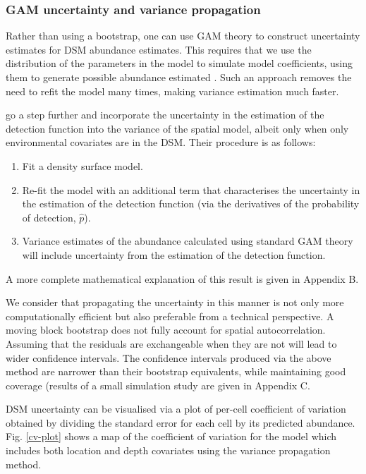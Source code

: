 \documentclass[a4paper,12pt]{article}
\begin{document}
\subsubsection*{GAM uncertainty and variance propagation}

Rather than using a bootstrap, one can use GAM theory to construct uncertainty estimates for DSM abundance estimates. This requires that we use the distribution of the parameters in the model to simulate model coefficients, using them to generate possible abundance estimated \citep[further information can found in][page 245]{Wood:2006wz}. Such an approach removes the need to refit the model many times, making variance estimation much faster.
 
\cite{WILLIAMS:2011in} go a step further and incorporate the uncertainty in the estimation of the detection function into the variance of the spatial model, albeit only when only environmental covariates are in the DSM. Their procedure is as follows:
\begin{enumerate}
\item Fit a density surface model.
\item Re-fit the model with an additional term that characterises the uncertainty in the estimation of the detection function (via the derivatives of the probability of detection, $\hat{p}$).
\item Variance estimates of the abundance calculated using standard GAM theory will include uncertainty from the estimation of the detection function.
\end{enumerate}
A more complete mathematical explanation of this result is given in Appendix B.

We consider that propagating the uncertainty in this manner is not only more computationally efficient but also preferable from a technical perspective. A moving block bootstrap does not fully account for spatial autocorrelation. Assuming that the residuals are exchangeable when they are not will lead to wider confidence intervals. The confidence intervals produced via the above method are narrower than their bootstrap equivalents, while maintaining good coverage (results of a small simulation study are given in Appendix C.

DSM uncertainty can be visualised via a plot of per-cell coefficient of variation obtained by dividing the standard error for each cell by its predicted abundance. Fig. \ref{cv-plot} shows a map of the coefficient of variation for the model which includes both location and depth covariates using the variance propagation method. 
\end{document}
